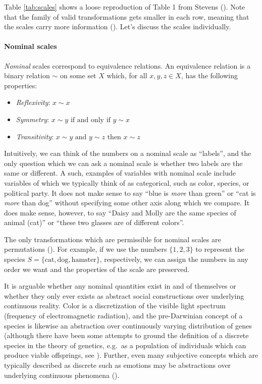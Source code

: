 \documentclass[
]{book}
\providecommand{\tightlist}{%
  \setlength{\itemsep}{0pt}\setlength{\parskip}{0pt}}
\theoremstyle{definition}
\theoremstyle{definition}
\theoremstyle{definition}
\theoremstyle{definition}
\theoremstyle{remark}
\begin{document}
Table \ref{tab:scales} shows a loose reproduction of Table 1 from Stevens (). Note that the family of valid transformations gets smaller in each row, meaning that the scales carry more information (). Let's discuss the scales individually.

\paragraph{Nominal scales}\label{nominal-scales}

\emph{Nominal} scales correspond to equivalence relations. An equivalence relation is a binary relation \(\sim\) on some set \(X\) which, for all \(x, y, z \in X\), has the following properties:

\begin{itemize}
\tightlist
\item
  \emph{Reflexivity}: \(x \sim x\)
\item
  \emph{Symmetry}: \(x \sim y \text{ if and only if } y \sim x\)
\item
  \emph{Transitivity}: \(x \sim y \text{ and } y \sim z \text{ then } x \sim z\)
\end{itemize}

Intuitively, we can think of the numbers on a nominal scale as ``labels'', and the only question which we can ask a nominal scale is whether two labels are the same or different. A such, examples of variables with nominal scale include variables of which we typically think of as categorical, such as color, species, or political party. It does not make sense to say ``blue is \emph{more} than green'' or ``cat is \emph{more} than dog'' without specifying some other axis along which we compare. It does make sense, however, to say ``Daisy and Molly are the same species of animal (cat)'' or ``these two glasses are of different colors''.

The only transformations which are permissible for nominal scales are permutations (). For example, if we use the numbers \(\{ 1, 2, 3 \}\) to represent the species \(S = \{ \text{cat}, \text{dog}, \text{hamster} \}\), respectively, we can assign the numbers in any order we want and the properties of the scale are preserved.

It is arguable whether any nominal quantities exist in and of themselves or whether they only ever exists as abstract social constructions over underlying continuous reality. Color is a discretization of the visible light spectrum (frequency of electromagnetic radiation), and the pre-Darwinian concept of a species is likewise an abstraction over continuously varying distribution of genes (although there have been some attempts to ground the definition of a discrete species in the theory of genetics, e.g.~as a population of individuals which can produce viable offsprings, see ). Further, even many subjective concepts which are typically described as discrete such as emotions may be abstractions over underlying continuous phenomena ().
\end{document}
